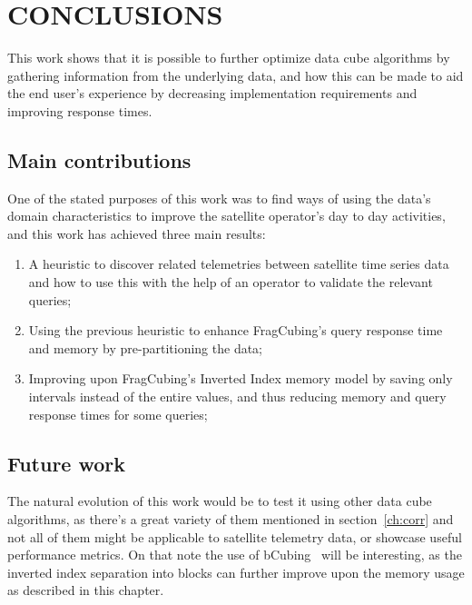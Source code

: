 
\chapter{CONCLUSIONS}\label{ch:concl}

This work shows that it is possible to further optimize data cube algorithms by gathering information from the underlying data, and how this can be made to aid the end user's experience by decreasing implementation requirements and improving response times.

\section{Main contributions}\label{ch:concl:contrib}

One of the stated purposes of this work was to find ways of using the data's domain characteristics to improve the satellite operator's day to day activities, and this work has achieved three main results:

\begin{enumerate}
\item A heuristic to discover related telemetries between satellite time series data and how to use this with the help of an operator to validate the relevant queries;
\item Using the previous heuristic to enhance FragCubing's query response time and memory by pre-partitioning the data;
\item Improving upon FragCubing's Inverted Index memory model by saving only intervals instead of the entire values, and thus reducing memory and query response times for some queries;
\end{enumerate}

\section{Future work}\label{ch:concl:future}

The natural evolution of this work would be to test it using other data cube algorithms, as there's a great variety of them mentioned in section~\ref{ch:corr} and not all of them might be applicable to satellite telemetry data, or showcase useful performance metrics.
On that note the use of bCubing~\cite{silva:2015:abordagensParaCubo} will be interesting, as the inverted index separation into blocks can further improve upon the memory usage as described in this chapter.


